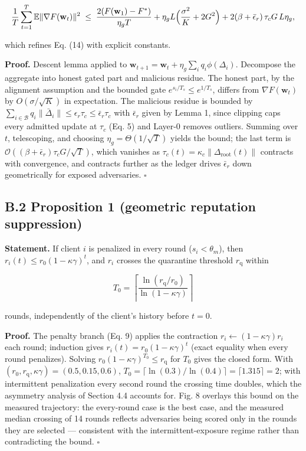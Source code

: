 \documentclass[cmc,article,submit,moreauthors,pdftex]{Definitions/tsp}
\begin{document}
\[
\frac{1}{T}\sum_{t=1}^{T} \mathbb{E}\|\nabla F(\mathbf{w}_t)\|^2 \;\le\; \frac{2(F(\mathbf{w}_1) - F^*)}{\eta_g T} + \eta_g L\Bigl(\frac{\sigma^2}{K} + 2G^2\Bigr) + 2(\beta + \bar\epsilon_r)\,\tau_c G \, L \eta_g,
\]

which refines Eq. (14) with explicit constants.

\textbf{Proof.} Descent lemma applied to $\mathbf{w}_{t+1} = \mathbf{w}_t + \eta_g \sum_i q_i \phi(\Delta_i)$. Decompose the aggregate into honest gated part and malicious residue. The honest part, by the alignment assumption and the bounded gate $e^{s_i/T_s} \le e^{1/T_s}$, differs from $\nabla F(\mathbf{w}_t)$ by $O(\sigma/\sqrt{K})$ in expectation. The malicious residue is bounded by $\sum_{i\in\mathcal{B}} q_i \|\bar\Delta_i\| \le \epsilon_r \tau_c \le \bar\epsilon_r \tau_c$ with $\bar\epsilon_r$ given by Lemma 1, since clipping caps every admitted update at $\tau_c$ (Eq. 5) and Layer-0 removes outliers. Summing over $t$, telescoping, and choosing $\eta_g = \Theta(1/\sqrt{T})$ yields the bound; the last term is $\mathcal{O}((\beta + \bar\epsilon_r)\tau_c G/\sqrt{T})$, which vanishes as $\tau_c(t) = \kappa_c\|\Delta_{\mathrm{root}}(t)\|$ contracts with convergence, and contracts further as the ledger drives $\bar\epsilon_r$ down geometrically for exposed adversaries. $\square$

\subsection*{B.2 Proposition 1 (geometric reputation suppression)}

\textbf{Statement.} If client $i$ is penalized in every round ($s_i < \theta_m$), then $r_i(t) \le r_0 (1-\kappa\gamma)^t$, and $r_i$ crosses the quarantine threshold $r_{\mathrm{q}}$ within

\[
T_0 = \left\lceil \frac{\ln(r_{\mathrm{q}}/r_0)}{\ln(1-\kappa\gamma)} \right\rceil
\]

rounds, independently of the client's history before $t=0$.

\textbf{Proof.} The penalty branch (Eq. 9) applies the contraction $r_i \leftarrow (1-\kappa\gamma) r_i$ each round; induction gives $r_i(t) = r_0(1-\kappa\gamma)^t$ (exact equality when every round penalizes). Solving $r_0(1-\kappa\gamma)^{T_0} \le r_{\mathrm{q}}$ for $T_0$ gives the closed form. With $(r_0, r_{\mathrm{q}}, \kappa\gamma) = (0.5, 0.15, 0.6)$, $T_0 = \lceil \ln(0.3)/\ln(0.4) \rceil = \lceil 1.315 \rceil = 2$; with intermittent penalization every second round the crossing time doubles, which the asymmetry analysis of Section 4.4 accounts for. Fig. 8 overlays this bound on the measured trajectory: the every-round case is the best case, and the measured median crossing of 14 rounds reflects adversaries being scored only in the rounds they are selected --- consistent with the intermittent-exposure regime rather than contradicting the bound. $\square$
\end{document}
